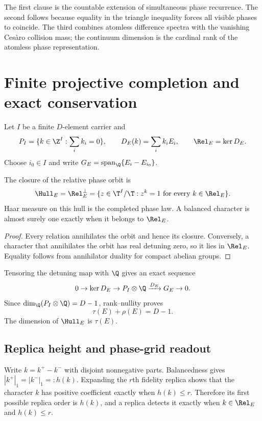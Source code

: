 The first clause is the countable extension of simultaneous phase recurrence.
The second follows because equality in the triangle inequality forces all
visible phases to coincide.  The third combines atomless difference spectra
with the vanishing Ces\`aro collision mass; the continuum dimension is the
cardinal rank of the atomless phase representation.

\section{Finite projective completion and exact conservation}

Let $I$ be a finite $D$-element carrier and
\[
 P_I=\{k\in\Z^I:\sum_ik_i=0\},\qquad
 D_E(k)=\sum_i k_iE_i,
 \qquad\Rel_E=\ker D_E.
\]
Choose $i_0\in I$ and write
$G_E=\operatorname{span}_{\Q}\{E_i-E_{i_0}\}$.

\begin{theorem}
The closure of the relative phase orbit is
\[
 \Hull_E=\Rel_E^\perp
 =\{z\in\T^I/\T:z^k=1\text{ for every }k\in\Rel_E\}.
\]
Haar measure on this hull is the completed phase law.  A balanced character
is almost surely one exactly when it belongs to $\Rel_E$.
\end{theorem}

\begin{proof}
Every relation annihilates the orbit and hence its closure.  Conversely, a
character that annihilates the orbit has real detuning zero, so it lies in
$\Rel_E$.  Equality follows from annihilator duality for compact abelian
groups.
\end{proof}

Tensoring the detuning map with $\Q$ gives an exact sequence
\[
 0\to\ker D_E\to P_I\otimes\Q\xrightarrow{D_E}G_E\to0.
\]
Since $\dim_\Q(P_I\otimes\Q)=D-1$, rank--nullity proves
\[
 \tau(E)+\rho(E)=D-1.
\]
The dimension of $\Hull_E$ is $\tau(E)$.

\subsection{Replica height and phase-grid readout}

Write $k=k^+-k^-$ with disjoint nonnegative parts.  Balancedness gives
$|k^+|_1=|k^-|_1=:h(k)$.  Expanding the $r$th fidelity replica shows that
the character $k$ has positive coefficient exactly when $h(k)\le r$.
Therefore its first possible replica order is $h(k)$, and a replica detects
it exactly when $k\in\Rel_E$ and $h(k)\le r$.


